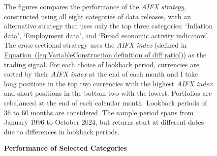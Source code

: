 \documentclass[12pt,oneside,letter]{article}
\newcommand*{\myeq}[1]{\hyperref[{#1}]{Equation~(\ref*{#1})}}
\begin{document}
\begin{landscape}
	
	\begin{figure}

	    \begin{center}
	    	\caption{\bf Performance of Selected Categories}
		    \medskip
		     \label{fig:Categories:CS strategy sharpe ratio all categories vs top three}
	    \end{center}
	
	
	    \begin{small}
	    The figures compares the performance of the \textit{AIFX strategy}, constructed using all eight categories of data releases, with an alternative strategy that uses only the top three categories: ‘Inflation data’, ‘Employment data’, and ‘Broad economic activity indicators’. The cross-sectional strategy uses the \textit{AIFX index} (defined in \myeq{eq:VariableConstruction:definition of diff ratio}) as the trading signal. For each choice of lookback period, currencies are sorted by their \textit{AIFX index} at the end of each month and I take long positions in the top two currencies with the highest \textit{AIFX index} and short positions in the bottom two with the lowest. Portfolios are rebalanced at the end of each calendar month. Lookback periods of 36 to 60 months are considered. The sample period spans from January 1996 to October 2024, but returns start at different dates due to differences in lookback periods.
	    \end{small}



\end{figure}
\end{landscape}
\end{document}
